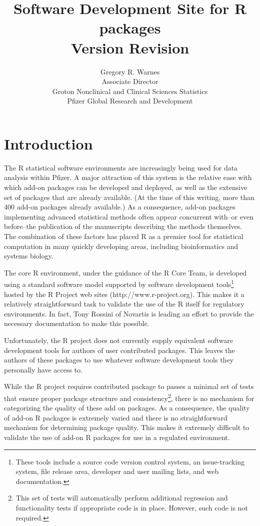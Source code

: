 \documentclass[12pt]{article}
\title{Software Development Site for R packages\\
			 Version $ $Revision$ $ }
\author{Gregory R. Warnes\\
	Associate Director\\
	Groton Nonclinical and Clinical Sciences Statistics\\
	Pfizer Global Research and Development}
\begin{document}
\maketitle

\section{Introduction}

The R statistical software environments are increasingly being used
for data analysis within Pfizer.	A major attraction of this system is
the relative ease with which add-on packages can be developed and
deployed, as well as the extensive set of packages that are already
available.	(At the time of this writing, more than 400 add-on
packages already available.)	As a consequence, add-on packages
implementing advanced statistical methods often appear concurrent
with--or even before--the publication of the manuscripts describing
the methods themselves.	 The combination of these factors has placed R
as a premier tool for statistical computation in many quickly
developing areas, including bioinformatics and systems biology.

The core R environment, under the guidance of the R Core Team, is
developed using a standard software model supported by software
development tools\footnote{These tools include a source code version
	control system, an issue-tracking system, file release area,
	developer and user mailing lists, and web documentation.}	 hosted by
the R Project web sites (http://www.r-project.org).	 This makes it a
relatively straightforward task to validate the use of the R itself
for regulatory environments.	In fact, Tony Rossini of Novartis is
leading an effort to provide the necessary documentation to make
this possible.

Unfortunately, the R project does not currently supply equivalent
software development tools for authors of user contributed packages.
This leaves the authors of these packages to use whatever software
development tools they personally have access to.

While the R project requires contributed package to passes a minimal
set of tests that ensure proper package structure and
consistency\footnote{This set of tests will automatically perform
	additional regression and functionality tests if appropriate code is
	in place.	 However, such code is not required.}, there is no
mechanism for categorizing the quality of these add on packages.	As a
consequence, the quality of add-on R packages is extremely varied and
there is no straightforward mechanism for determining package quality.
This makes it extremely difficult to validate the use of add-on R
packages for use in a regulated environment.
\end{document}
